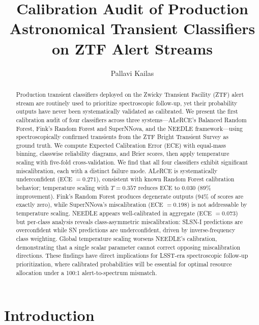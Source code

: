 \documentclass[twocolumn]{aastex631}
\begin{document}
\title{Calibration Audit of Production Astronomical Transient Classifiers on ZTF Alert Streams}

\author{Pallavi Kailas}

\begin{abstract}
Production transient classifiers deployed on the Zwicky Transient Facility (ZTF) alert stream are routinely used to prioritize spectroscopic follow-up, yet their probability outputs have never been systematically validated as calibrated. We present the first calibration audit of four classifiers across three systems---ALeRCE's Balanced Random Forest, Fink's Random Forest and SuperNNova, and the NEEDLE framework---using spectroscopically confirmed transients from the ZTF Bright Transient Survey as ground truth. We compute Expected Calibration Error (ECE) with equal-mass binning, classwise reliability diagrams, and Brier scores, then apply temperature scaling with five-fold cross-validation. We find that all four classifiers exhibit significant miscalibration, each with a distinct failure mode. ALeRCE is systematically underconfident (ECE $= 0.271$), consistent with known Random Forest calibration behavior; temperature scaling with $T = 0.357$ reduces ECE to $0.030$ (89\% improvement). Fink's Random Forest produces degenerate outputs (94\% of scores are exactly zero), while SuperNNova's miscalibration (ECE $= 0.198$) is not addressable by temperature scaling. NEEDLE appears well-calibrated in aggregate (ECE $= 0.073$) but per-class analysis reveals class-asymmetric miscalibration: SLSN-I predictions are overconfident while SN predictions are underconfident, driven by inverse-frequency class weighting. Global temperature scaling worsens NEEDLE's calibration, demonstrating that a single scalar parameter cannot correct opposing miscalibration directions. These findings have direct implications for LSST-era spectroscopic follow-up prioritization, where calibrated probabilities will be essential for optimal resource allocation under a 100:1 alert-to-spectrum mismatch.
\end{abstract}


\section{Introduction} \label{sec:intro}
\end{document}
